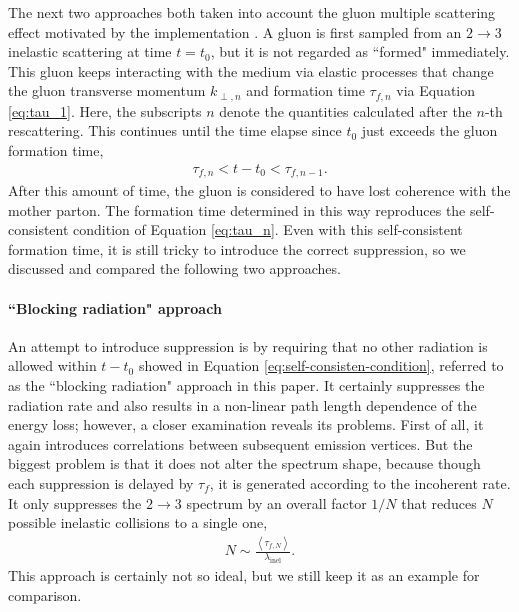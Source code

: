 \documentclass[aps, prc, reprint, amsmath, groupedaddress, nofootinbib]{revtex4-1}
\begin{document}
The next two approaches both taken into account the gluon multiple scattering effect motivated by the implementation \cite{Zapp:2011ya}.
A gluon is first sampled from an $2\rightarrow3$ inelastic scattering at time $t=t_0$, but it is not regarded as ``formed" immediately. 
This gluon keeps interacting with the medium via elastic processes that change the gluon transverse momentum $k_{\perp,n}$ and formation time $\tau_{f,n}$ via Equation \ref{eq:tau_1}.
Here, the subscripts $n$ denote the quantities calculated after the $n$-th rescattering.
This continues until the time elapse since $t_0$ just exceeds the gluon formation time,
\begin{eqnarray}\label{eq:self-consisten-condition}
\tau_{f, n} < t-t_0 < \tau_{f, n-1}.
\end{eqnarray}
After this amount of time, the gluon is considered to have lost coherence with the mother parton.
The formation time determined in this way reproduces the self-consistent condition of Equation \ref{eq:tau_n}.
Even with this self-consistent formation time, it is still tricky to introduce the correct suppression, so we discussed and compared the following two approaches. 

\paragraph*{``Blocking radiation" approach}
An attempt to introduce suppression is by requiring that no other radiation is allowed within $t-t_0$ showed in Equation \ref{eq:self-consisten-condition}, referred to as the ``blocking radiation" approach in this paper.
It certainly suppresses the radiation rate and also results in a non-linear path length dependence of the energy loss; however, a closer examination reveals its problems.
First of all, it again introduces correlations between subsequent emission vertices.
But the biggest problem is that it does not alter the spectrum shape, because though each suppression is delayed by $\tau_f$, it is generated according to the incoherent rate. 
It only suppresses the $2\rightarrow 3$ spectrum by an overall factor $1/N$ that reduces $N$ possible inelastic collisions to a single one,
\begin{eqnarray}
N \sim \frac{\left\langle\tau_{f,N}\right\rangle}{ \lambda_{\textrm{inel}}}.
\end{eqnarray}
This approach is certainly not so ideal, but we still keep it as an example for comparison.
\end{document}
